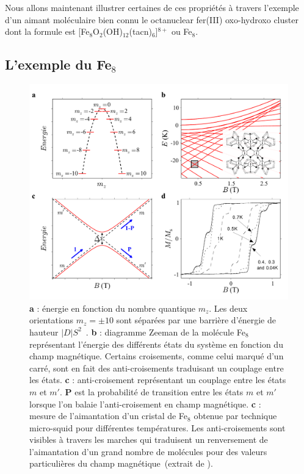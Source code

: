 Nous allons maintenant illustrer certaines de ces propriétés à travers l'exemple d'un aimant moléculaire bien connu le octanuclear fer(III) oxo-hydroxo cluster dont la formule est [Fe$_8$O$_2$(OH)$_{12}$(tacn)$_6$]$^{8+}$ ou Fe$_8$.

\subsection{L'exemple du Fe$_8$}

\begin{figure}
\centering \includegraphics[scale=0.45]{Spintronique/FigureFe8/FigureFe8.pdf} 
\caption{\textbf{a} : énergie en fonction du nombre quantique $m_z$. Les deux orientations $m_z=\pm 10$ sont séparées par une barrière d'énergie de hauteur $|D|S^2$~\cite{Bogani2008}. \textbf{b} : diagramme Zeeman de la molécule Fe$_8$ représentant l'énergie des différents états du système en fonction du champ magnétique. Certains croisements, comme celui marqué d'un carré, sont en fait des anti-croisements traduisant un couplage entre les états. \textbf{c} : anti-croisement représentant un couplage entre les états $m$ et $m'$. \textbf{P} est la probabilité de transition entre les états $m$ et $m'$ lorsque l'on balaie l'anti-croisement en champ magnétique. \textbf{c} : mesure de l'aimantation d'un cristal de Fe$_8$ obtenue par technique micro-squid pour différentes températures. Les anti-croisements sont visibles à travers les marches qui traduisent un renversement de l'aimantation d'un grand nombre de molécules pour des valeurs particulières du champ magnétique~(extrait de \cite{MagGoesNano}).}
\label{Fe8Zeeman}
\end{figure}


